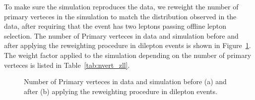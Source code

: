To make sure the simulation reproduces the data, we reweight the number of
primary verteces in the simulation to match the distribution observed in the 
data, after requiring that the event has two leptons passing offline
lepton selection. The number of Primary verteces in data and simulation before and
after applying the reweighting procedure in dilepton events is shown in
Figure~\ref{fig:nvert_zll}. The weight factor applied to the simulation 
depending on the number of primary verteces is listed in 
Table~\ref{tab:nvert_zll}.

\begin{figure}[!htbp]
\begin{center}
\caption{Number of Primary verteces in data and simulation before (a) and
after (b) applying the reweighting procedure in dilepton events.}
\label{fig:nvert_zll}
\end{center}
\end{figure}

